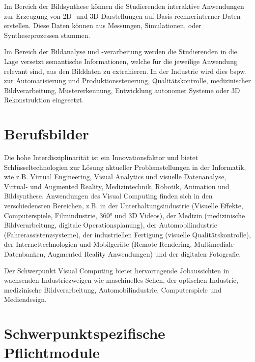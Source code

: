 Im Bereich der Bildsynthese können die Studierenden interaktive
Anwendungen zur Erzeugung von 2D- und 3D-Darstellungen auf Basis
rechnerinterner Daten erstellen. Diese Daten können aus Messungen,
Simulationen, oder Syntheseprozessen stammen.

Im Bereich der Bildanalyse und -verarbeitung werden die Studierenden in
die Lage versetzt semantische Informationen, welche für die jeweilige
Anwendung relevant sind, aus den Bilddaten zu extrahieren. In der
Industrie wird dies bspw. zur Automatisierung und Produktionssteuerung,
Qualitätskontrolle, medizinischer Bildverarbeitung, Mustererkennung,
Entwicklung autonomer Systeme oder 3D Rekonstruktion eingesetzt.

\section*{Berufsbilder\label{/mi-2017/modulbeschreibungen-master/schwerpunkt-visual-computing}}\label{berufsbilderpathlabelmi-2017modulbeschreibungen-masterschwerpunkt-visual-computing}

Die hohe Interdisziplinarität ist ein Innovationsfaktor und bietet
Schlüsseltechnologien zur Lösung aktueller Problemstellungen in der
Informatik, wie z.B. Virtual Engineering, Visual Analytics und visuelle
Datenanalyse, Virtual- und Augmented Reality, Medizintechnik, Robotik,
Animation und Bildsynthese. Anwendungen des Visual Computing finden sich
in den verschiedensten Bereichen, z.B. in der Unterhaltungsindustrie
(Visuelle Effekte, Computerspiele, Filmindustrie, 360° und 3D Videos),
der Medizin (medizinische Bildverarbeitung, digitale Operationsplanung),
der Automobilindustrie (Fahrerassistenzsysteme), der industriellen
Fertigung (visuelle Qualitätskontrolle), der Internettechnologien und
Mobilgeräte (Remote Rendering, Multimediale Datenbanken, Augmented
Reality Anwendungen) und der digitalen Fotografie.

Der Schwerpunkt Visual Computing bietet hervorragende Jobaussichten in
wachsenden Industriezweigen wie maschinelles Sehen, der optischen
Industrie, medizinische Bildverarbeitung, Automobilindustrie,
Computerspiele und Mediendesign.

\section*{Schwerpunktspezifische
Pflichtmodule\label{/mi-2017/modulbeschreibungen-master/schwerpunkt-visual-computing}}\label{schwerpunktspezifische-pflichtmodulepathlabelmi-2017modulbeschreibungen-masterschwerpunkt-visual-computing}

